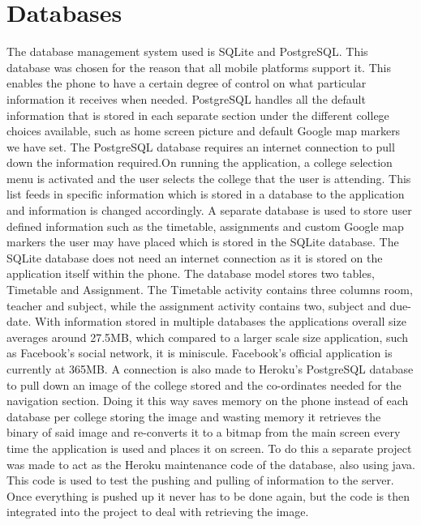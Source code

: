 \section{Databases}
The database management system used is SQLite and PostgreSQL. This database was chosen for the reason that all mobile platforms support it. This enables the phone to have a certain degree of control on what particular information it receives when needed. PostgreSQL handles all the default information that is stored in each separate section under the different college choices available, such as home screen picture and default Google map markers we have set. The PostgreSQL database requires an internet connection to pull down the information required.On running the application, a college selection menu is activated and the user selects the college that the user is attending. This list feeds in specific information which is stored in a database to the application and information is changed accordingly. A separate database is used to store user defined information such as the timetable, assignments and custom Google map markers the user may have placed which is stored in the SQLite database. The SQLite database does not need an internet connection as it is stored on the application itself within the phone. The database model stores two tables, Timetable and Assignment. The Timetable activity contains three columns room, teacher and subject, while the assignment activity contains two, subject and due-date. With information stored in multiple databases the applications overall size averages around 27.5MB, which compared to a larger scale size application, such as Facebook’s social network, it is miniscule. Facebook’s official application is currently at 365MB. 
A connection is also made to Heroku’s PostgreSQL database to pull down an image of the college stored and the co-ordinates needed for the navigation section. Doing it this way saves memory on the phone instead of each database per college storing the image and wasting memory it retrieves the binary of said image and re-converts it to a bitmap from the main screen every time the application is used and places it on screen. To do this a separate project was made to act as the Heroku maintenance code of the database, also using java. This code is used to test the pushing and pulling of information to the server. Once everything is pushed up it never has to be done again, but the code is then integrated into the project to deal with retrieving the image.

